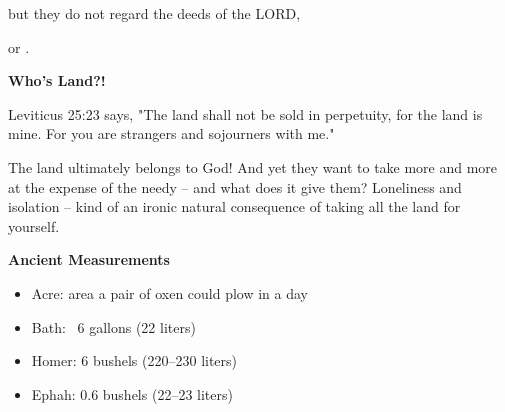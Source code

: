 \documentclass[11pt]{article}
\begin{document}
\begin{chiasticoutline}[Isaiah 5:8-14 (B)]{.95em}{2em}
{        but they do not regard the deeds of the LORD,

        \poetryline or .
    }
     
    

\end{chiasticoutline}


\vspace{3em}
{\large\bfseries Who's Land?!}
\vspace{1em}

Leviticus 25:23 says, "The land shall not be sold in perpetuity, for the land is mine. For you are strangers and sojourners with me."

{\vspace{1em}}
The land ultimately belongs to God! And yet they want to take more and more at the expense of the needy – and what does it give them? Loneliness and isolation – kind of an ironic natural consequence of taking all the land for yourself.


\vspace{3em}
{\large\bfseries Ancient Measurements}
\vspace{1em}

\begin{itemize}
    \item Acre: area a pair of oxen could plow in a day
    \item Bath: ~6 gallons (22 liters)
    \item Homer: 6 bushels (220–230 liters)
    \item Ephah: 0.6 bushels (22–23 liters)
\end{itemize}
\end{document}
